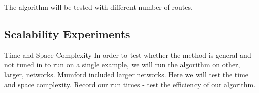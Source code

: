 


The algorithm will be tested with different number of routes.



\subsection{Scalability Experiments}
Time and Space Complexity
In order to test whether the method is general and not tuned in to run on a single example, we will run the algorithm on other, larger, networks. Mumford included larger networks. Here we will test the time and space complexity.
Record our run times - test the efficiency of our algorithm.




